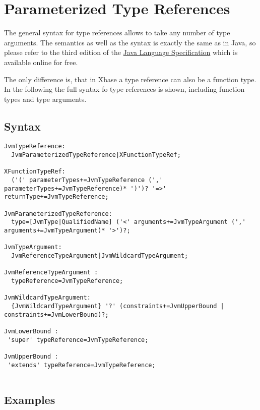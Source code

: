\documentclass[a4paper,10pt]{scrreprt}
\begin{document}
\section{Parameterized Type References\label{ParameterizedTypeReference}}
The general syntax for type references allows to take any number of type arguments. The semantics as well as the syntax is exactly the same as in Java, so please 
refer to the third edition of the  \href{http://java.sun.com/docs/books/jls/third_edition/html/j3TOC.html}{Java Language Specification} which is available online for free.

The only difference is, that in Xbase a type reference can also be a function type. In the following the full syntax fo type references is shown, including function types and
type arguments.

\subsection{Syntax}
\begin{lstlisting}
JvmTypeReference:
  JvmParameterizedTypeReference|XFunctionTypeRef;
	
XFunctionTypeRef:
  ('(' parameterTypes+=JvmTypeReference (',' parameterTypes+=JvmTypeReference)* ')')? '=>' returnType+=JvmTypeReference;

JvmParameterizedTypeReference:
  type=[JvmType|QualifiedName] ('<' arguments+=JvmTypeArgument (',' arguments+=JvmTypeArgument)* '>')?;

JvmTypeArgument:
  JvmReferenceTypeArgument|JvmWildcardTypeArgument;
  
JvmReferenceTypeArgument :
  typeReference=JvmTypeReference;

JvmWildcardTypeArgument:
  {JvmWildcardTypeArgument} '?' (constraints+=JvmUpperBound | constraints+=JvmLowerBound)?;

JvmLowerBound :
 'super' typeReference=JvmTypeReference;

JvmUpperBound : 
 'extends' typeReference=JvmTypeReference;


\end{lstlisting}





\subsection{Examples}
\end{document}

